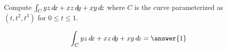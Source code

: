\documentclass{ximera}
\author{David Guichard \and Neal Koblitz \and H. Jerome Keisler \and Albert Scheller \and Barry Balof \and Mike Wills \and Matthew Carr}
\begin{document}
\begin{exercise}




Compute $\int_C yz\mathop{}\!d\! x+xz \mathop{}\!d\! y+xy\mathop{}\!d\! z$ where $C$ is the curve parameterized as $(t,t^2,t^3)$ for $0\le t\le 1$.

\begin{prompt}
\[
\int_C yz\d x+xz \d y+xy\d z=\answer{1}
\]
\end{prompt}



\end{exercise}
\end{document}
